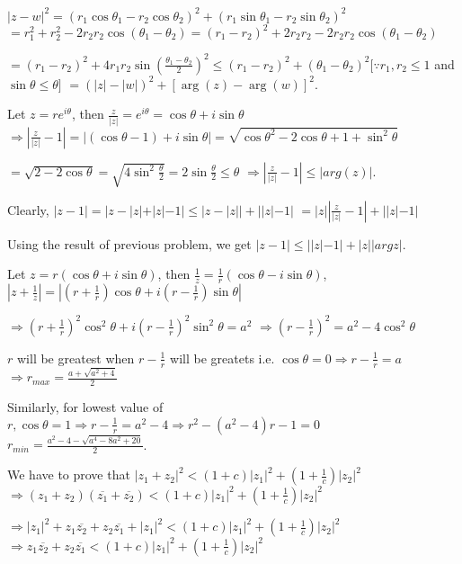   $|z - w|^2 = (r_1\cos\theta_1 - r_2\cos\theta_2)^2 + (r_1\sin\theta_1 - r_2\sin\theta_2)^2$
  $= r_1^2 + r_2^2 - 2r_2r_2\cos(\theta_1 - \theta_2) = (r_1 - r_2)^2 + 2r_2r_2 - 2r_2r_2\cos(\theta_1 - \theta_2)$

  $= (r_1 - r_2)^2 + 4r_1r_2\sin\left(\frac{\theta_1 - \theta_2}{2}\right)^2\leq (r_1 - r_2)^2 + (\theta_1 -
  \theta_2)^2[\because r_1, r_2\leq 1$ and $\sin\theta \leq \theta]$
  $= (|z| - |w|)^2 + [\arg(z) - \arg(w)]^2$.
\item Let $z = re^{i\theta}$, then $\frac{z}{|z|} = e^{i\theta} = \cos\theta + i\sin\theta$
  $\Rightarrow \left|\frac{z}{|z|} - 1\right| = |(\cos\theta - 1) + i\sin\theta| = \sqrt{\cos\theta^2 -
  2\cos\theta + 1 + \sin^2\theta}$

  $= \sqrt{2 - 2\cos\theta} = \sqrt{4\sin^2\frac{\theta}{2}} = 2\sin\frac{\theta}{2}\leq \theta$
  $\Rightarrow \left|\frac{z}{|z|} - 1\right| \leq |arg(z)|$.
\item Clearly, $|z - 1| = |z - |z| + |z| - 1|\leq |z - |z|| + ||z| - 1|$
  $= |z|\left|\frac{z}{|z|} - 1\right| + ||z| - 1|$

  Using the result of previous problem, we get $|z - 1| \leq ||z| - 1|+|z||argz|$.
\item Let $z = r(\cos\theta + i\sin\theta)$, then $\frac{1}{z} = \frac{1}{r}(\cos\theta - i\sin\theta)$,
  $\left|z + \frac{1}{z}\right| = \left|\left(r + \frac{1}{r}\right)\cos\theta + i\left(r -
  \frac{1}{r}\right)\sin\theta\right|$

  $\Rightarrow \left(r + \frac{1}{r}\right)^2\cos^2\theta + i\left(r - \frac{1}{r}\right)^2\sin^2\theta =
  a^2$ $\Rightarrow \left(r - \frac{1}{r}\right)^2 = a^2 - 4\cos^2\theta$

  $r$ will be greatest when $r - \frac{1}{r}$ will be greatets i.e. $\cos\theta= 0 \Rightarrow r -
  \frac{1}{r} = a$ $\Rightarrow r_{max} = \frac{a + \sqrt{a^2 + 4}}{2}$

  Similarly, for lowest value of $r, \cos\theta = 1 \Rightarrow r - \frac{1}{r} = a^2 - 4 \Rightarrow r^2 -
  (a^2 - 4)r - 1 = 0$ $r_{min} = \frac{a^2- 4 - \sqrt{a^4 - 8a^2 + 20}}{2}$.
\item We have to prove that $|z_1 + z_2|^2 < (1 + c)|z_1|^2 + \left(1 + \frac{1}{c}\right)|z_2|^2$
  $\Rightarrow (z_1 + z_2)(\overline{z_1} + \overline{z_2}) < (1 + c)|z_1|^2 + \left(1 + \frac{1}{c}\right)|z_2|^2$

  $\Rightarrow |z_1|^2 + z_1\overline{z_2} + z_2\overline{z_1} + |z_1|^2 < (1 + c)|z_1|^2 + \left(1 + \frac{1}{c}\right)|z_2|^2$
  $\Rightarrow z_1\overline{z_2} + z_2\overline{z_1} < (1 + c)|z_1|^2 + \left(1 + \frac{1}{c}\right)|z_2|^2$

